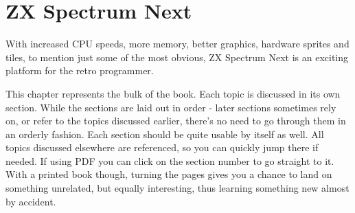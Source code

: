 \chapter{ZX Spectrum Next}



\ChapterTOC[]

\pagebreak
\thispagestyle{plain} %

With increased CPU speeds, more memory, better graphics, hardware sprites and tiles, to mention just some of the most obvious, ZX Spectrum Next is an exciting platform for the retro programmer.

This chapter represents the bulk of the book. Each topic is discussed in its own section. While the sections are laid out in order - later sections sometimes rely on, or refer to the topics discussed earlier, there's no need to go through them in an orderly fashion. Each section should be quite usable by itself as well. All topics discussed elsewhere are referenced, so you can quickly jump there if needed. If using PDF you can click on the section number to go straight to it. With a printed book though, turning the pages gives you a chance to land on something unrelated, but equally interesting, thus learning something new almost by accident.

